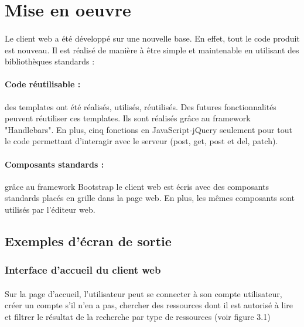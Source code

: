 \documentclass{report}
\begin{document}
\section{Mise en oeuvre}

\paragraph{}
Le client web a été développé sur une nouvelle base. En effet, tout le code produit est nouveau. Il est réalisé de manière
à être simple et maintenable en utilisant des bibliothèques standards :

\paragraph{Code réutilisable :} des templates ont été réalisés, utilisés, réutilisés. Des futures fonctionnalités 
peuvent réutiliser ces templates. Ils sont réalisés grâce au framework "Handlebars". En plus, cinq fonctions en 
JavaScript-jQuery seulement pour tout le code permettant d'interagir avec le serveur (post, get, post et del, patch).
 
\paragraph{Composants standards :} grâce au framework Bootstrap le client web est écris avec des composants standards
placés en grille dans la page web. En plus, les mêmes composants sont utilisés par l'éditeur web.

\subsection{Exemples d'écran de sortie}

\subsubsection{Interface d'accueil du client web}

\paragraph{}
Sur la page d'accueil, l'utilisateur peut se connecter à son compte utilisateur, créer un compte s'il n'en a pas, chercher
des ressources dont il est autorisé à lire et filtrer le résultat de la recherche par type de ressources (voir figure 3.1)

\newpage
\end{document}
